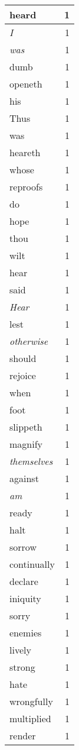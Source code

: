\begin{center}
\begin{longtable}{l|r}
heard & 1\\ \hline 
\emph{I} & 1\\ \hline 
\emph{was} & 1\\ \hline 
dumb & 1\\ \hline 
openeth & 1\\ \hline 
his & 1\\ \hline 
Thus & 1\\ \hline 
was & 1\\ \hline 
heareth & 1\\ \hline 
whose & 1\\ \hline 
reproofs & 1\\ \hline 
do & 1\\ \hline 
hope & 1\\ \hline 
thou & 1\\ \hline 
wilt & 1\\ \hline 
hear & 1\\ \hline 
said & 1\\ \hline 
\emph{Hear} & 1\\ \hline 
lest & 1\\ \hline 
\emph{otherwise} & 1\\ \hline 
should & 1\\ \hline 
rejoice & 1\\ \hline 
when & 1\\ \hline 
foot & 1\\ \hline 
slippeth & 1\\ \hline 
magnify & 1\\ \hline 
\emph{themselves} & 1\\ \hline 
against & 1\\ \hline 
\emph{am} & 1\\ \hline 
ready & 1\\ \hline 
halt & 1\\ \hline 
sorrow & 1\\ \hline 
continually & 1\\ \hline 
declare & 1\\ \hline 
iniquity & 1\\ \hline 
sorry & 1\\ \hline 
enemies & 1\\ \hline 
lively & 1\\ \hline 
strong & 1\\ \hline 
hate & 1\\ \hline 
wrongfully & 1\\ \hline 
multiplied & 1\\ \hline 
render & 1\\ \hline 

\end{longtable}
\end{center}
